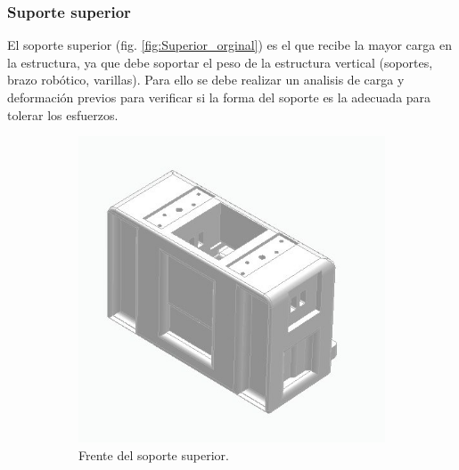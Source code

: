 \subsubsection{Suporte superior}
El soporte superior (fig. \ref{fig:Superior_orginal}) es el que recibe la mayor carga en la estructura, ya que debe soportar el peso de la estructura vertical (soportes, brazo robótico, varillas). Para ello se debe realizar un analisis de carga y deformación previos para verificar si la forma del soporte es la adecuada para tolerar los esfuerzos.
\begin{figure}[H]
    \centering
    \begin{subfigure}[b]{0.45\textwidth}
        \centering
        \includegraphics[width=\textwidth]{img/Superior_frente.jpg}
        \caption{Frente del soporte superior.}
        \label{fig:izaje_desacoplado}
    \end{subfigure}
    \hspace{0.02\textwidth}
    \begin{subfigure}[b]{0.45\textwidth}
        \centering

\end{subfigure}
\end{figure}
